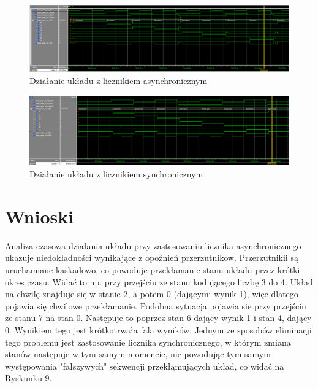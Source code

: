 \documentclass[wide,a4paper,titlepage,12pt] {article}
\begin{document}
\newpage
\begin{landscape}

  \begin{figure}[htbp]
    \begin{center}
      \includegraphics[scale=0.3]{ukl_asynch.png}
      \caption{Działanie układu z licznikiem asynchronicznym}
    \end{center}
  \end{figure}


  \begin{figure}[htbp]
    \begin{center}
      \includegraphics[scale=0.3]{ukl_synch.png}
      \caption{Działanie układu z licznikiem synchronicznym}
    \end{center}
  \end{figure}
\end{landscape}
\newpage

  \section{Wnioski}
Analiza czasowa działania układu przy zastosowaniu licznika asynchronicznego ukazuje niedokładności
wynikające z opoźnień przerzutnikow.
Przerzutnikii są uruchamiane kaskadowo, co powoduje przekłamanie stanu układu przez krótki okres czasu.
Widać to np. przy przejściu ze stanu kodującego liczbę 3 do 4. Układ na chwilę znajduje się w stanie 2,
a potem 0 (dającymi wynik 1), więc dlatego pojawia się chwilowe przekłamanie.
Podobna sytuacja pojawia sie przy przejściu ze stanu 7 na stan 0.
Następuje to poprzez stan 6 dający wynik 1 i stan 4, dający 0.
Wynikiem tego jest krótkotrwała fala wyników.
Jednym ze sposobów eliminacji tego problemu jest zastosowanie licznika synchronicznego,
w którym zmiana stanów następuje w tym samym momencie, nie powodując tym samym występowania
"fałszywych" sekwencji przekłąmujących układ, co widać na Ryskunku 9.
\end{document}
